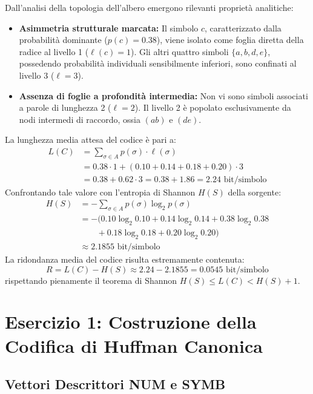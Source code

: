 Dall'analisi della topologia dell'albero emergono rilevanti propriet\`a analitiche:
\begin{itemize}
  \item \textbf{Asimmetria strutturale marcata:} Il simbolo $c$, caratterizzato dalla probabilit\`a dominante ($p(c) = 0.38$), viene isolato come foglia diretta della radice al livello 1 ($\ell(c) = 1$). Gli altri quattro simboli $\{a, b, d, e\}$, possedendo probabilit\`a individuali sensibilmente inferiori, sono confinati al livello 3 ($\ell = 3$).
  \item \textbf{Assenza di foglie a profondit\`a intermedia:} Non vi sono simboli associati a parole di lunghezza 2 ($\ell = 2$). Il livello 2 \`e popolato esclusivamente da nodi intermedi di raccordo, ossia $(ab)$ e $(de)$.
\end{itemize}

La lunghezza media attesa del codice \`e pari a:
\begin{align}
  L(C) &= \sum_{\sigma \in A} p(\sigma) \cdot \ell(\sigma) \nonumber \\
       &= 0.38 \cdot 1 + (0.10 + 0.14 + 0.18 + 0.20) \cdot 3 \nonumber \\
       &= 0.38 + 0.62 \cdot 3 = 0.38 + 1.86 = 2.24 \text{ bit/simbolo}
\end{align}
Confrontando tale valore con l'entropia di Shannon $H(S)$ della sorgente:
\begin{align}
  H(S) &= -\sum_{\sigma \in A} p(\sigma) \log_2 p(\sigma) \nonumber \\
       &= -\big(0.10 \log_2 0.10 + 0.14 \log_2 0.14 + 0.38 \log_2 0.38 \nonumber \\
       &\quad\quad + 0.18 \log_2 0.18 + 0.20 \log_2 0.20\big) \nonumber \\
       &\approx 2.1855 \text{ bit/simbolo}
\end{align}
La ridondanza media del codice risulta estremamente contenuta:
\begin{equation}
  R = L(C) - H(S) \approx 2.24 - 2.1855 = 0.0545 \text{ bit/simbolo}
\end{equation}
rispettando pienamente il teorema di Shannon $H(S) \le L(C) < H(S) + 1$.

\FloatBarrier
\section{Esercizio 1: Costruzione della Codifica di Huffman Canonica}
\label{sec:esercizio-huffman-canonica}

\subsection{Vettori Descrittori NUM e SYMB}
\label{subsec:vettori-descrittori-canonica}

